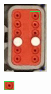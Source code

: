 \documentclass[11pt,a4paper, margin=1in]{report}
\begin{document}
\begin{figure}
\centering
	\begin{subfigure}{0.3\linewidth}
		\centering
	\includegraphics[width=0.7\linewidth]{"pin hole"}
		\label{fig:pin1}
	\end{subfigure}
		\begin{subfigure}{0.3\linewidth}
			\centering
\includegraphics[width=0.7\linewidth]{"pin hole2"}
			\label{fig:pin2}
		\end{subfigure}

\end{figure}
\end{document}
